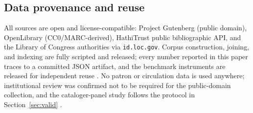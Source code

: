 \subsection{Data provenance and reuse}
\label{sec:data:provenance}

All sources are open and license-compatible: Project Gutenberg (public
domain), OpenLibrary (CC0/MARC-derived), HathiTrust public bibliographic
API, and the Library of Congress authorities via \texttt{id.loc.gov}.
Corpus construction, joining, and indexing are fully scripted and released;
every number reported in this paper traces to a committed JSON artifact,
and the benchmark instruments are released for independent reuse
.
No patron or circulation data is used anywhere; institutional review was
confirmed not to be required for the public-domain collection, and the
cataloger-panel study follows the protocol in
Section~\ref{sec:valid} .
